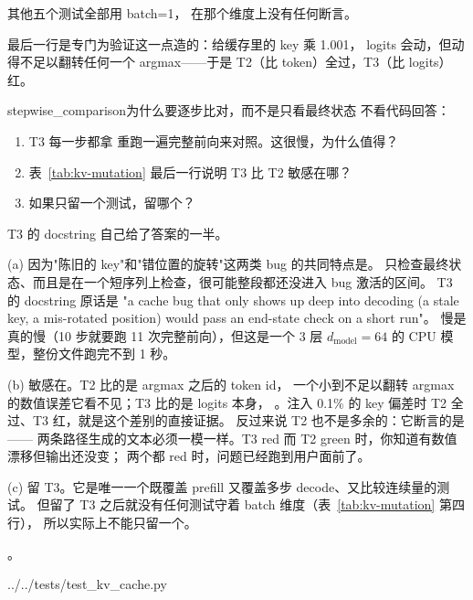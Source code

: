  其他五个测试全部用 batch=1，
在那个维度上没有任何断言。

 最后一行是专门为验证这一点造的：给缓存里的 key 乘 1.001，
logits 会动，但动得不足以翻转任何一个 argmax——于是 T2（比 token）全过，T3（比 logits）红。

\begin{checkpoint}{stepwise_comparison}{为什么要逐步比对，而不是只看最终状态}
不看代码回答：
\begin{enumerate}[label=(\alph*)]
  \item T3 每一步都拿  重跑一遍完整前向来对照。这很慢，为什么值得？
  \item 表~\ref{tab:kv-mutation} 最后一行说明 T3 比 T2 敏感在哪？
  \item 如果只留一个测试，留哪个？
\end{enumerate}
\hint T3 的 docstring 自己给了答案的一半。

\ifshowanswers
\tcblower
\answer (a) 因为"陈旧的 key"和"错位置的旋转"这两类 bug 的共同特点是。
只检查最终状态、而且是在一个短序列上检查，很可能整段都还没进入 bug 激活的区间。
T3 的 docstring 原话是 "a cache bug that only shows up deep into decoding
(a stale key, a mis-rotated position) would pass an end-state check on a short run"。
慢是真的慢（10 步就要跑 11 次完整前向），但这是一个 3 层 $d_{\text{model}}{=}64$ 的
CPU 模型，整份文件跑完不到 1 秒。

(b) 敏感在。T2 比的是 argmax 之后的 token id，
一个小到不足以翻转 argmax 的数值误差它看不见；T3 比的是 logits 本身，
。注入 0.1\% 的 key 偏差时 T2 全过、T3 红，就是这个差别的直接证据。
反过来说 T2 也不是多余的：它断言的是——
两条路径生成的文本必须一模一样。T3 red 而 T2 green 时，你知道有数值漂移但输出还没变；
两个都 red 时，问题已经跑到用户面前了。

(c) 留 T3。它是唯一一个既覆盖 prefill 又覆盖多步 decode、又比较连续量的测试。
但留了 T3 之后就没有任何测试守着 batch 维度（表~\ref{tab:kv-mutation} 第四行），
所以实际上不能只留一个。

\whereincode {}。
\fi
\end{checkpoint}

%
  {../../tests/test_kv_cache.py}

